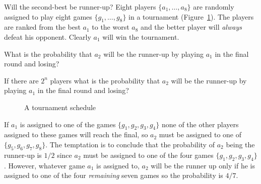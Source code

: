 \begin{prob}{Will the second-best be runner-up?}
Eight players $\{a_1,\ldots,a_8\}$ are randomly assigned to play eight games $\{g_1,\ldots,g_8\}$ in a tournament (Figure~\ref{f.tournament}). The players are ranked from the best $a_1$ to the worst $a_8$ and the better player will \emph{always} defeat his opponent.  Clearly $a_1$ will win the tournament.

 What is the probability that $a_2$ will be the runner-up by playing $a_1$ in the final round and losing?

 If there are $2^n$ players what is the probability that $a_2$ will be the runner-up by playing $a_1$ in the final round and losing?
\end{prob}
\begin{figure}[tb]
\begin{center}
\end{center}
\caption{A tournament schedule}\label{f.tournament}
\end{figure}

\solution{}

If $a_1$ is assigned to one of the games $\{g_1,g_2,g_3,g_4\}$ none of the other players assigned to these games will reach the final, so $a_2$ must be assigned to one of $\{g_5,g_6,g_7,g_8\}$. The temptation is to conclude that the probability of $a_2$ being the runner-up is $1/2$ since $a_2$ must be assigned to one of the four games $\{g_1,g_2,g_3,g_4\}$. However, whatever game $a_1$ is  assigned to, $a_2$ will be the runner up only if he is assigned to one of the four \emph{remaining} seven games so the probability is $4/7$.

